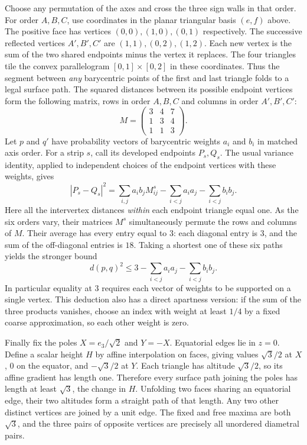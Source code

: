 Choose any permutation of the axes and cross the three sign walls in that order. For order $A,B,C$, use coordinates in the planar triangular basis $(e,f)$ above. The positive face has vertices $(0,0),(1,0),(0,1)$ respectively. The successive reflected vertices $A',B',C'$ are $(1,1),(0,2),(1,2)$. Each new vertex is the sum of the two shared endpoints minus the vertex it replaces. The four triangles tile the convex parallelogram $[0,1]\times[0,2]$ in these coordinates. Thus the segment between \emph{any} barycentric points of the first and last triangle folds to a legal surface path. The squared distances between its possible endpoint vertices form the following matrix, rows in order $A,B,C$ and columns in order $A',B',C'$:
\[
 M=\begin{pmatrix}3&4&7\\1&3&4\\1&1&3\end{pmatrix}.
\]
Let $p$ and $q'$ have probability vectors of barycentric weights $a_i$ and $b_i$ in matched axis order. For a strip $s$, call its developed endpoints $P_s,Q_s$. The usual variance identity, applied to independent choices of the endpoint vertices with these weights, gives
\[
 |P_s-Q_s|^2=\sum_{i,j}a_i b_j M^s_{ij}
 -\sum_{i<j}a_i a_j-\sum_{i<j}b_i b_j.
\]
Here all the intervertex distances \emph{within} each endpoint triangle equal one. As the six orders vary, their matrices $M^s$ simultaneously permute the rows and columns of $M$. Their average has every entry equal to $3$: each diagonal entry is $3$, and the sum of the off-diagonal entries is $18$. Taking a shortest one of these six paths yields the stronger bound
\[
 d(p,q)^2\le 3-\sum_{i<j}a_i a_j-\sum_{i<j}b_i b_j.
\]
In particular equality at $3$ requires each vector of weights to be supported on a single vertex. This deduction also has a direct apartness version: if the sum of the three products vanishes, choose an index with weight at least $1/4$ by a fixed coarse approximation, so each other weight is zero.

Finally fix the poles $X=e_3/\sqrt2$ and $Y=-X$. Equatorial edges lie in $z=0$. Define a scalar height $H$ by affine interpolation on faces, giving values $\sqrt3/2$ at $X$, $0$ on the equator, and $-\sqrt3/2$ at $Y$. Each triangle has altitude $\sqrt3/2$, so its affine gradient has length one. Therefore every surface path joining the poles has length at least $\sqrt3$, the change in $H$. Unfolding two faces sharing an equatorial edge, their two altitudes form a straight path of that length. Any two other distinct vertices are joined by a unit edge. The fixed and free maxima are both $\sqrt3$, and the three pairs of opposite vertices are precisely all unordered diametral pairs.
